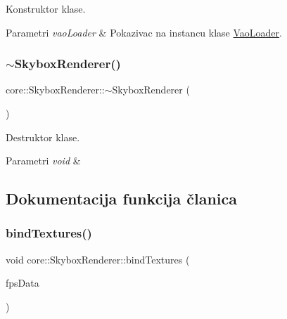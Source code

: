 Konstruktor klase. 


\begin{DoxyParams}{Parametri}
{\em vao\+Loader} & Pokazivac na instancu klase \hyperlink{classcore_1_1VaoLoader}{Vao\+Loader}. \\
\hline
\end{DoxyParams}
\mbox{\label{classcore_1_1SkyboxRenderer_aa2c93db248d8df20a05823139e8751a7}} 
\subsubsection{\texorpdfstring{$\sim$\+Skybox\+Renderer()}{~SkyboxRenderer()}}
{\footnotesize\ttfamily core\+::\+Skybox\+Renderer\+::$\sim$\+Skybox\+Renderer (\begin{DoxyParamCaption}{ }\end{DoxyParamCaption})}



Destruktor klase. 


\begin{DoxyParams}{Parametri}
{\em void} & \\
\hline
\end{DoxyParams}


\subsection{Dokumentacija funkcija članica}
\mbox{\label{classcore_1_1SkyboxRenderer_a555969e8b9ba0bf2a2dea2756974c3b6}} 
\subsubsection{\texorpdfstring{bind\+Textures()}{bindTextures()}}
{\footnotesize\ttfamily void core\+::\+Skybox\+Renderer\+::bind\+Textures (\begin{DoxyParamCaption}\item[{\hyperlink{classutility_1_1FpsData}{Fps\+Data} $\ast$}]{fps\+Data }\end{DoxyParamCaption})\hspace{0.3cm}{\ttfamily [private]}}



